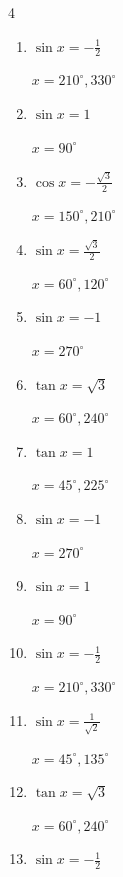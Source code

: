 \begin{multicols}{4}
\begin{enumerate}
  \item $\displaystyle \sin{x}  = -\frac{1}{2}$

        $\displaystyle x = 210^{\circ} , 330^{\circ}$

  \item $\displaystyle \sin{x}  = 1$

        $\displaystyle x = 90^{\circ}$

  \item $\displaystyle \cos{x}  = -\frac{\sqrt{3}}{2}$

        $\displaystyle x = 150^{\circ} , 210^{\circ}$

  \item $\displaystyle \sin{x}  = \frac{\sqrt{3}}{2}$

        $\displaystyle x = 60^{\circ} , 120^{\circ}$

  \item $\displaystyle \sin{x}  = -1$

        $\displaystyle x = 270^{\circ}$

  \item $\displaystyle \tan{x}  = \sqrt{3}$

        $\displaystyle x = 60^{\circ} , 240^{\circ}$

  \item $\displaystyle \tan{x}  = 1$

        $\displaystyle x = 45^{\circ} , 225^{\circ}$

  \item $\displaystyle \sin{x}  = -1$

        $\displaystyle x = 270^{\circ}$

  \item $\displaystyle \sin{x}  = 1$

        $\displaystyle x = 90^{\circ}$

  \item $\displaystyle \sin{x}  = -\frac{1}{2}$

        $\displaystyle x = 210^{\circ} , 330^{\circ}$

  \item $\displaystyle \sin{x}  = \frac{1}{\sqrt{2}}$

        $\displaystyle x = 45^{\circ} , 135^{\circ}$

  \item $\displaystyle \tan{x}  = \sqrt{3}$

        $\displaystyle x = 60^{\circ} , 240^{\circ}$

  \item $\displaystyle \sin{x}  = -\frac{1}{2}$


\end{enumerate}
\end{multicols}
